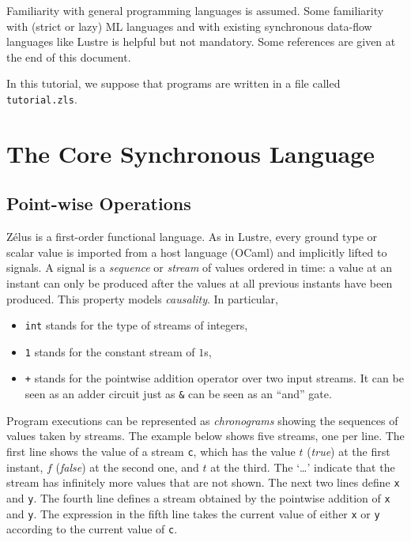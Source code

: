 \documentclass[11pt,titlepage,twoside]{report}
\newcommand{\zls}[1]{\texttt{#1}}
\newcommand{\f}{$f$}
\renewcommand{\t}{$t$}
\newcommand{\zelus}{{\sf Z\'elus}}
\newcommand{\lustre}{{\sf Lustre}}
\newcommand{\ocaml}{{\sf OCaml}}
\begin{document}
Familiarity with general programming languages is assumed.
Some familiarity with (strict or lazy) ML
languages and with existing synchronous data-flow languages like \lustre{} is
helpful but not mandatory. Some references are given at the end of this document.

In this tutorial, we suppose that programs are written in a file called
\verb-tutorial.zls-.%

\section{The Core Synchronous Language} %

\subsection{Point-wise Operations} %

\zelus{} is a first-order functional language. As in \lustre,
every ground type or scalar value is imported from a host language
(\ocaml{}) and implicitly lifted to signals. A signal is a
\emph{sequence} or \emph{stream} of values ordered in time:
a value at an instant can only be produced after the values at all previous 
instants have been produced. This property
models \emph{causality}. In particular,
\begin{itemize}
\item \verb-int- stands for the type of streams of integers,
\item \verb-1- stands for the constant stream of $1$s,
\item \verb-+- stands for the pointwise addition operator over two input 
streams. It can be seen as an adder circuit just as \verb-&- can be seen as an
  ``and'' gate.
\end{itemize}
Program executions can be represented as \emph{chronograms} showing the 
sequences of values taken by streams. The
example below shows five streams, one per line. The first line shows
the value of a stream \zls{c}, which has the value \t{} ({\em true}) at the 
first instant, \f{} ({\em false}) at the second one, and \t{} at the
third. The `\dots' indicate that the stream has infinitely more values that 
are not shown. The next two lines define \zls{x} and \zls{y}. The fourth 
line defines a stream obtained
by the pointwise addition of \zls{x} and \zls{y}.
The expression in the fifth line takes the current value of either \zls{x} 
or \zls{y} according to the current value of \zls{c}.
\end{document}
